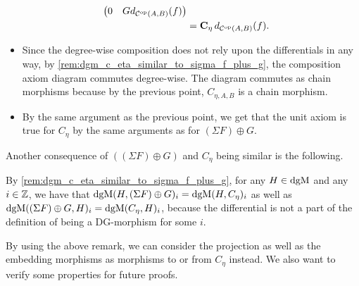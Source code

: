\begin{remark}
\begin{itemize}
{\begin{align*}
\begin{pmatrix}
                    0 & G d_{{\mathcal{C}}^{\operatorname{op}}(A, B)}(f)
                \end{pmatrix} \\
                &= \operatorname{\mathbf{C}}_{\eta} d_{{\mathcal{C}}^{\operatorname{op}}(A, B)}(f).
            \end{align*}
        }
        \item {
            Since the degree-wise composition does not rely upon the differentials in any way, by \autoref{rem:dgm_c_eta_similar_to_sigma_f_plus_g},
            the composition axiom diagram commutes degree-wise. The diagram commutes as chain morphisms because by the previous point, \( C_{\eta, A, B} \) is a chain morphism.
        }
        \item {
            By the same argument as the previous point, we get that the unit axiom is true for \( C_{\eta} \) by the same arguments as for \( (\Sigma F) \oplus G \).
        }
    \end{itemize}
\end{remark}

Another consequence of \( ((\Sigma F) \oplus G) \) and \( C_{\eta} \) being similar is the following.

\begin{remark}
    \label{rem:dgm_different_dg_morphisms_same_space_give_degree-wise_same_morphisms}
    By \autoref{rem:dgm_c_eta_similar_to_sigma_f_plus_g}, for any \( H \in \operatorname{dgM} \) and any \( i \in {\mathbb{Z}} \), we have that \( \operatorname{dgM}(H, (\Sigma F) \oplus G)_i = \operatorname{dgM}(H, C_{\eta})_i \) as well as \( \operatorname{dgM}((\Sigma F) \oplus G, H)_i = \operatorname{dgM}(C_{\eta}, H)_i \), because the differential is not a part of the definition of being a DG-morphism for some \( i \).
\end{remark}

By using the above remark, we can consider the projection as well as the embedding morphisms as morphisms to or from \( C_{\eta} \) instead. We also want to verify some properties for future proofs.

